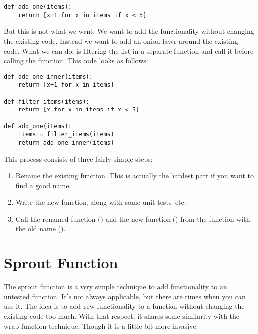 \begin{programcode}{}
\begin{verbatim}
def add_one(items):
    return [x+1 for x in items if x < 5]
\end{verbatim}
\end{programcode}

But this is not what we want. We want to add the functionality without changing the existing code. Instead we want to add an onion layer around the existing code. What we can do, is filtering the list in a separate function and call it before calling the  function. This code looks as follows:

\begin{programcode}{}
\begin{verbatim}
def add_one_inner(items):
    return [x+1 for x in items]

def filter_items(items):
    return [x for x in items if x < 5]

def add_one(items):
    items = filter_items(items)
    return add_one_inner(items)
\end{verbatim}
\end{programcode}

This process consists of three fairly simple steps:
\begin{enumerate}
    \item Rename the existing function. This is actually the hardest part if you want to find a good name.
    \item Write the new function, along with some unit tests, etc.
    \item Call the renamed function () and the new function \newline() from the function with the old name ().
\end{enumerate}

\section{Sprout Function}

The sprout function is a very simple technique to add functionality to an untested function. It's not always applicable, but there are times when you can use it. The idea is to add new functionality to a function without changing the existing code too much. With that respect, it shares some similarity with the wrap function technique. Though it is a little bit more invasive.

